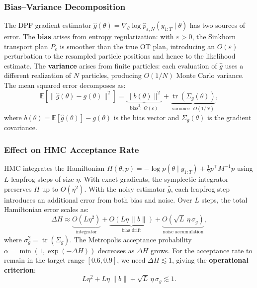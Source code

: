\documentclass[12pt,a4paper]{article}
\theoremstyle{definition}
\theoremstyle{remark}
\newcommand{\E}{\mathbb{E}}
\newcommand{\tr}{\operatorname{tr}}
\begin{document}
\subsubsection{Bias--Variance Decomposition}

The DPF gradient estimator $\hat{g}(\theta) = \nabla_\theta \log \hat{p}_{\varepsilon,N}(y_{1:T} \mid \theta)$ has two sources of error. The \textbf{bias} arises from entropy regularization: with $\varepsilon > 0$, the Sinkhorn transport plan $P_\varepsilon$ is smoother than the true OT plan, introducing an $O(\varepsilon)$ perturbation to the resampled particle positions and hence to the likelihood estimate. The \textbf{variance} arises from finite particles: each evaluation of $\hat{g}$ uses a different realization of $N$ particles, producing $O(1/N)$ Monte Carlo variance. The mean squared error decomposes as:
\begin{equation}
	\E\left[\|\hat{g}(\theta) - g(\theta)\|^2\right] = \underbrace{\|b(\theta)\|^2}_{\text{bias}^2:\; O(\varepsilon)} + \underbrace{\tr(\Sigma_g(\theta))}_{\text{variance}:\; O(1/N)},
	\label{eq:bias-variance}
\end{equation}
where $b(\theta) = \E[\hat{g}(\theta)] - g(\theta)$ is the bias vector and $\Sigma_g(\theta)$ is the gradient covariance.

\subsubsection{Effect on HMC Acceptance Rate}

HMC integrates the Hamiltonian $H(\theta, p) = -\log p(\theta \mid y_{1:T}) + \frac{1}{2} p^\top M^{-1} p$ using $L$ leapfrog steps of size $\eta$. With exact gradients, the symplectic integrator preserves $H$ up to $O(\eta^2)$. With the noisy estimator $\hat{g}$, each leapfrog step introduces an additional error from both bias and noise. Over $L$ steps, the total Hamiltonian error scales as:
\begin{equation}
	\Delta H \approx \underbrace{O(L \eta^2)}_{\text{integrator}} + \underbrace{O(L \eta \, \|b\|)}_{\text{bias drift}} + \underbrace{O(\sqrt{L} \, \eta \, \sigma_g)}_{\text{noise accumulation}},
\end{equation}
where $\sigma_g^2 = \tr(\Sigma_g)$. The Metropolis acceptance probability $\alpha = \min(1, \exp(-\Delta H))$ decreases as $\Delta H$ grows. For the acceptance rate to remain in the target range $[0.6, 0.9]$, we need $\Delta H \lesssim 1$, giving the \textbf{operational criterion}:
\begin{equation}
	L \eta^2 + L \eta \, \|b\| + \sqrt{L} \, \eta \, \sigma_g \lesssim 1.
	\label{eq:hmc-criterion}
\end{equation}
\end{document}
